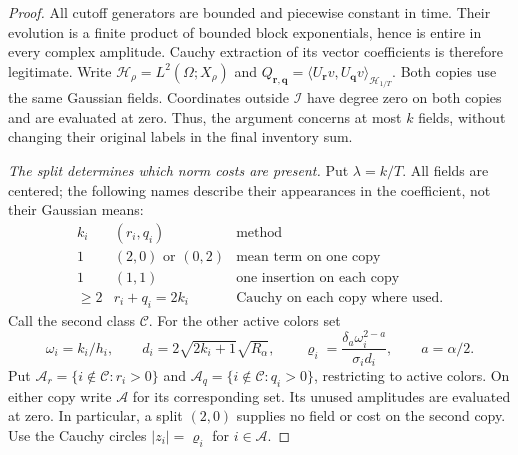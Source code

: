 \documentclass[12pt]{article}
\numberwithin{equation}{section}
\theoremstyle{definition}
\begin{document}
\begin{proof}
  All cutoff generators are bounded and piecewise constant in time.
  Their evolution is a finite product of bounded block exponentials,
  hence is entire in every complex amplitude. Cauchy extraction of its
  vector coefficients is therefore legitimate. Write
  $\mathcal H_\rho=L^2(\Omega;X_\rho)$ and
  $Q_{\boldsymbol r,\boldsymbol q}
  =\langle U_{\boldsymbol r}v,U_{\boldsymbol q}v\rangle_{\mathcal H_{1/T}}$.
  Both copies use the same Gaussian fields.
  Coordinates outside $\mathcal I$ have degree zero on both copies and
  are evaluated at zero. Thus, the argument concerns at most $k$ fields,
  without changing their original labels in the final inventory sum.

  \emph{The split determines which norm costs are present.}
  Put $\lambda=k/T$. All fields are centered; the following names describe
  their appearances in the coefficient, not their Gaussian means:
  \[
    \begin{array}{c|c|c}
      k_i & (r_i,q_i)&\text{method}\\ \hline
      1 &(2,0)\text{ or }(0,2)&\text{mean term on one copy}\\
      1 &(1,1)&\text{one insertion on each copy}\\
      \ge2 &r_i+q_i=2k_i&\text{Cauchy on each copy where used}.
    \end{array}
  \]
  Call the second class $\mathcal C$. For the other active colors set
  \[
    \omega_i=k_i/h_i,\qquad
    d_i=2\sqrt{2k_i+1}\sqrt{R_\alpha},\qquad
    \varrho_i=\frac{\delta_a\omega_i^{2-a}}{\sigma_i d_i},
    \qquad a=\alpha/2.
  \]
  Put $\mathcal A_r=\{i\notin\mathcal C:r_i>0\}$ and
  $\mathcal A_q=\{i\notin\mathcal C:q_i>0\}$, restricting to active colors.
  On either copy write $\mathcal A$ for its corresponding set.
  Its unused amplitudes are evaluated at zero.
  In particular, a split $(2,0)$ supplies no field or cost on the second
  copy. Use the Cauchy circles $|z_i|=\varrho_i$ for $i\in\mathcal A$.


\end{proof}
\end{document}
